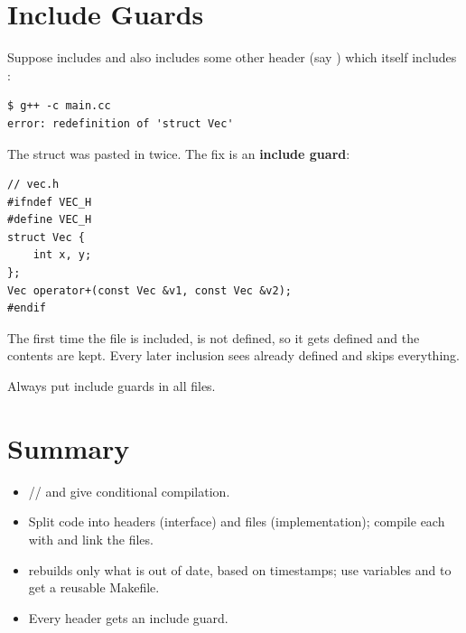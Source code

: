 \section{Include Guards}
Suppose  includes  and also includes some other
header (say ) which itself includes :
\begin{lstlisting}[style=bash]
$ g++ -c main.cc
error: redefinition of 'struct Vec'
\end{lstlisting}
The struct was pasted in twice. The fix is an \textbf{include guard}:
\begin{center}
\end{center}
\begin{lstlisting}[style=cpp]
// vec.h
#ifndef VEC_H
#define VEC_H
struct Vec {
    int x, y;
};
Vec operator+(const Vec &v1, const Vec &v2);
#endif
\end{lstlisting}
The first time the file is included,  is not defined, so it gets
defined and the contents are kept. Every later inclusion sees 
already defined and skips everything.

\begin{important}[Rule]
Always put include guards in all  files.
\end{important}

\section*{Summary}
\begin{itemize}
  \item {}// and  give
        conditional compilation.
  \item Split code into headers (interface) and  files
        (implementation); compile each with  and link the 
        files.
  \item {} rebuilds only what is out of date, based on timestamps; use
        variables and  to get a reusable Makefile.
  \item Every header gets an include guard.
\end{itemize}
